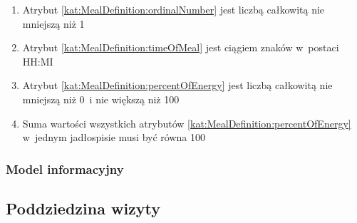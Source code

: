 \begin{itemize}[label={\textbf{Ograniczenia dla}}, wide, labelwidth=!, labelindent=0pt]
\begin{enumerate}[label={\textbf{OGR/3/\protect\twodigits{\arabic{enumi}}}}, wide, labelwidth=!, align=left, leftmargin=3cm, resume]
        \item Atrybut \ref{kat:MealDefinition:ordinalNumber} jest liczbą całkowitą nie mniejszą niż 1
        \item Atrybut \ref{kat:MealDefinition:timeOfMeal} jest ciągiem znaków w~postaci HH:MI
        \item Atrybut \ref{kat:MealDefinition:percentOfEnergy} jest liczbą całkowitą nie mniejszą niż 0~i nie większą niż 100
        \item Suma wartości wszystkich atrybutów \ref{kat:MealDefinition:percentOfEnergy} w~jednym jadłospisie musi być równa 100
    \end{enumerate}
\end{itemize}

\subsubsection{Model informacyjny}\label{subsubsec:database:mealplans:domainModel}


\subsection{Poddziedzina wizyty}\label{subsec:database:appointments}


